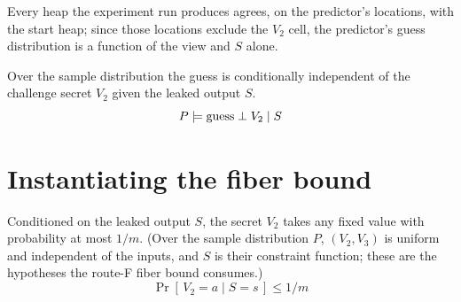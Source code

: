 \begin{lemma}
  \label{lem:run_heap_agree_predictor}
  \rocqok
  Every heap the experiment run produces agrees, on the predictor's locations,
  with the start heap; since those locations exclude the $V_2$ cell, the
  predictor's guess distribution is a function of the view and $S$ alone.
\end{lemma}

\begin{lemma}
  \label{lem:guess_cinde_V2}
  \rocqok
  Over the sample distribution the guess is conditionally independent of the
  challenge secret $V_2$ given the leaked output $S$.
  \[ P \models \mathrm{guess} \perp V_2 \mid S \]
\end{lemma}

\section{Instantiating the fiber bound}

\begin{lemma}
  \label{lem:guess_V2_cond_le}
  \rocqok
  Conditioned on the leaked output $S$, the secret $V_2$ takes any fixed value
  with probability at most $1/m$. (Over the sample distribution $P$, $(V_2,V_3)$
  is uniform and independent of the inputs, and $S$ is their constraint function;
  these are the hypotheses the route-F fiber bound consumes.)
  \[ \Pr[\,V_2 = a \mid S = s\,] \le 1/m \]
\end{lemma}


